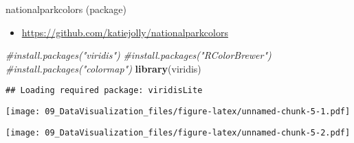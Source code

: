 \documentclass[]{article}
\newenvironment{Shaded}{\begin{snugshade}}{\end{snugshade}}
\newcommand{\CommentTok}[1]{\textcolor[rgb]{0.56,0.35,0.01}{\textit{#1}}}
\newcommand{\DataTypeTok}[1]{\textcolor[rgb]{0.13,0.29,0.53}{#1}}
\newcommand{\DecValTok}[1]{\textcolor[rgb]{0.00,0.00,0.81}{#1}}
\newcommand{\KeywordTok}[1]{\textcolor[rgb]{0.13,0.29,0.53}{\textbf{#1}}}
\newcommand{\NormalTok}[1]{#1}
\newcommand{\OperatorTok}[1]{\textcolor[rgb]{0.81,0.36,0.00}{\textbf{#1}}}
\providecommand{\tightlist}{%
  \setlength{\itemsep}{0pt}\setlength{\parskip}{0pt}}
\begin{document}
nationalparkcolors (package)

\begin{itemize}
\tightlist
\item
  \url{https://github.com/katiejolly/nationalparkcolors}
\end{itemize}

\begin{Shaded}
\begin{Highlighting}[]
\CommentTok{#install.packages("viridis")}
\CommentTok{#install.packages("RColorBrewer")}
\CommentTok{#install.packages("colormap")}
\KeywordTok{library}\NormalTok{(viridis)}
\end{Highlighting}
\end{Shaded}

\begin{verbatim}
## Loading required package: viridisLite
\end{verbatim}

\begin{Shaded}
\end{Shaded}

\texttt{[image: 09\_DataVisualization\_files/figure-latex/unnamed-chunk-5-1.pdf]}

\begin{Shaded}
\end{Shaded}

\texttt{[image: 09\_DataVisualization\_files/figure-latex/unnamed-chunk-5-2.pdf]}

\begin{Shaded}
\end{Shaded}
\end{document}
